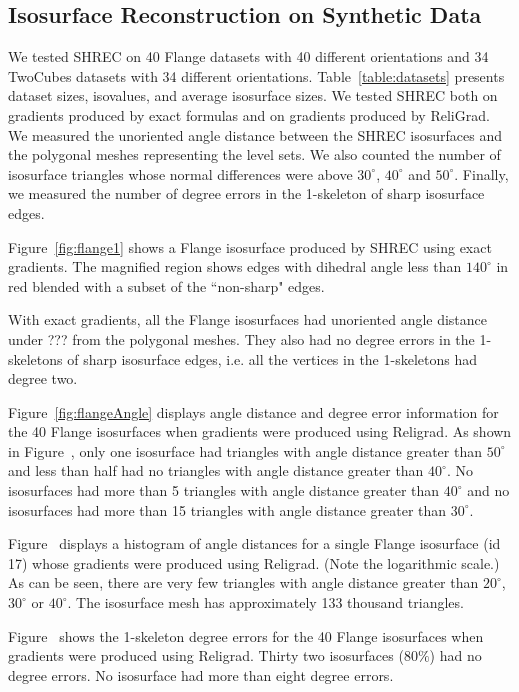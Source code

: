 \subsection{Isosurface Reconstruction on Synthetic Data}
\label{section:synthetic_tests}

We tested SHREC on 40 Flange datasets with 40 different orientations
and 34 TwoCubes datasets with 34 different orientations.
Table~\ref{table:datasets} presents dataset sizes, isovalues,
and average isosurface sizes.
We tested SHREC both on gradients produced by exact formulas 
and on gradients produced by ReliGrad.
We measured the unoriented angle distance between the SHREC isosurfaces
and the polygonal meshes representing the level sets.
We also counted the number of isosurface triangles whose normal differences
were above $30^\circ$, $40^\circ$ and $50^\circ$.
Finally, we measured the number of degree errors 
in the 1-skeleton of sharp isosurface edges.

Figure~\ref{fig:flange1} shows a Flange isosurface produced by SHREC
using exact gradients.
The magnified region shows edges with dihedral angle
less than $140^\circ$ in red blended with a subset of the ``non-sharp"
edges.

With exact gradients,
all the Flange isosurfaces had unoriented angle distance
under ??? from the polygonal meshes.
They also had no degree errors in the 1-skeletons
of sharp isosurface edges,
i.e. all the vertices in the 1-skeletons had degree two.

Figure~\ref{fig:flangeAngle} displays angle distance and degree error
information for the 40 Flange isosurfaces
when gradients were produced using Religrad.
As shown in Figure~,
only one isosurface had triangles with angle distance greater than $50^\circ$
and less than half had no triangles with angle distance greater than $40^\circ$.
No isosurfaces had more than 5 triangles with angle distance
greater than $40^\circ$
and no isosurfaces had more than 15 triangles with angle distance greater
than $30^\circ$.

Figure~ displays a histogram of angle distances
for a single Flange isosurface (id 17) 
whose gradients were produced using Religrad.
(Note the logarithmic scale.)
As can be seen,
there are very few triangles with angle distance
greater than $20^\circ$, $30^\circ$ or $40^\circ$.
The isosurface mesh has approximately 133
thousand triangles. 

Figure~\protect{} shows the 1-skeleton degree errors
for the 40 Flange isosurfaces when gradients were produced using Religrad.
Thirty two isosurfaces (80$\%$) had no degree errors.
No isosurface had more than eight degree errors.


